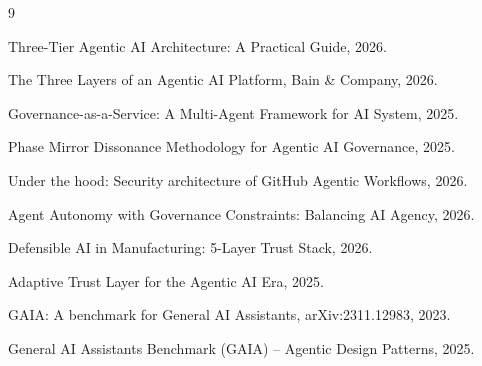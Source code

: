 \documentclass[11pt]{article}
\begin{document}

\begin{thebibliography}{9}

Three-Tier Agentic AI Architecture: A Practical Guide, 2026.

The Three Layers of an Agentic AI Platform, Bain \& Company, 2026.

Governance-as-a-Service: A Multi-Agent Framework for AI System, 2025.

Phase Mirror Dissonance Methodology for Agentic AI Governance, 2025.

Under the hood: Security architecture of GitHub Agentic Workflows, 2026.

Agent Autonomy with Governance Constraints: Balancing AI Agency, 2026.

Defensible AI in Manufacturing: 5-Layer Trust Stack, 2026.

Adaptive Trust Layer for the Agentic AI Era, 2025.

GAIA: A benchmark for General AI Assistants, arXiv:2311.12983, 2023.

General AI Assistants Benchmark (GAIA) -- Agentic Design Patterns, 2025.

\end{thebibliography}
\end{document}
